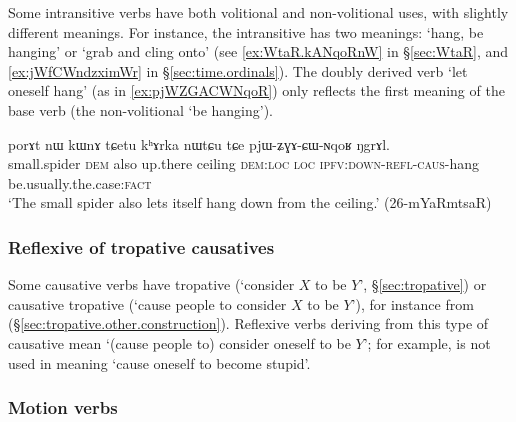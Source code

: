 Some intransitive verbs have both volitional and non-volitional uses, with slightly different meanings. For instance, the intransitive  has two meanings: `hang, be hanging' or `grab and cling onto' (see \ref{ex:WtaR.kANqoRnW} in §\ref{sec:WtaR}, and \ref{ex:jWfCWndzximWr} in §\ref{sec:time.ordinals}). The doubly derived verb  `let oneself hang' (as in \ref{ex:pjWZGACWNqoR}) only reflects the first meaning of the base verb  (the non-volitional `be hanging').

\begin{exe}
\ex \label{ex:pjWZGACWNqoR}
\gll  porɤt nɯ kɯnɤ tɕetu kʰɤrka nɯtɕu tɕe pjɯ-ʑɣɤ-ɕɯ-ɴqoʁ ŋgrɤl. \\
small.spider \textsc{dem} also up.there ceiling \textsc{dem}:\textsc{loc} \textsc{loc} \textsc{ipfv}:\textsc{down}-\textsc{refl}-\textsc{caus}-hang be.usually.the.case:\textsc{fact} \\
\glt `The small spider also lets itself hang down from the ceiling.' (26-mYaRmtsaR) 
 \end{exe}
 
 

% 
 
 
 
\subsubsection{Reflexive of tropative causatives} \label{sec:refl.trop.caus}
Some causative verbs have tropative (`consider $X$ to be $Y$', §\ref{sec:tropative}) or causative tropative (`cause people to consider $X$ to be $Y$'), for instance  from  (§\ref{sec:tropative.other.construction}). Reflexive verbs deriving from this type of causative mean `(cause people to) consider oneself to be $Y$'; for example,  is not used in meaning `cause oneself to become stupid'.
 
 
 \subsubsection{Motion verbs} \label{sec:refl.caus.motion}

